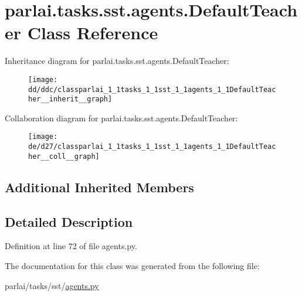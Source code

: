 \hypertarget{classparlai_1_1tasks_1_1sst_1_1agents_1_1DefaultTeacher}{}\section{parlai.\+tasks.\+sst.\+agents.\+Default\+Teacher Class Reference}
\label{classparlai_1_1tasks_1_1sst_1_1agents_1_1DefaultTeacher}


Inheritance diagram for parlai.\+tasks.\+sst.\+agents.\+Default\+Teacher\+:
\nopagebreak
\begin{figure}[H]
\begin{center}
\leavevmode
\texttt{[image: dd/ddc/classparlai\_1\_1tasks\_1\_1sst\_1\_1agents\_1\_1DefaultTeacher\_\_inherit\_\_graph]}
\end{center}
\end{figure}


Collaboration diagram for parlai.\+tasks.\+sst.\+agents.\+Default\+Teacher\+:
\nopagebreak
\begin{figure}[H]
\begin{center}
\leavevmode
\texttt{[image: de/d27/classparlai\_1\_1tasks\_1\_1sst\_1\_1agents\_1\_1DefaultTeacher\_\_coll\_\_graph]}
\end{center}
\end{figure}
\subsection*{Additional Inherited Members}


\subsection{Detailed Description}


Definition at line 72 of file agents.\+py.



The documentation for this class was generated from the following file\+:\begin{DoxyCompactItemize}
\item 
parlai/tasks/sst/\hyperlink{parlai_2tasks_2sst_2agents_8py}{agents.\+py}\end{DoxyCompactItemize}
